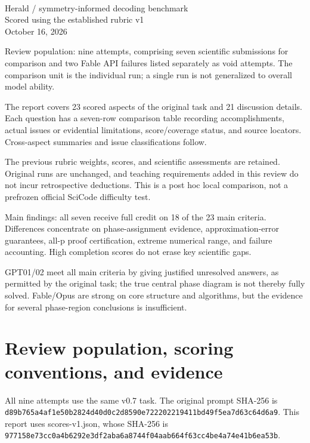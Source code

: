 \documentclass[11pt,a4paper]{article}
\begin{document}
\fontsize{10.5}{15.2}\selectfont

\begin{center}\vspace*{12mm}{\LARGE\bfseries Seven valid AI submissions\\[4mm]Aspect-by-aspect comparative study}\\[6mm]{\large Herald / symmetry-informed decoding benchmark}\\[3mm]{\large Scored using the established rubric v1}\\[5mm]October 16, 2026\end{center}
Review population: nine attempts,\allowbreak{} comprising seven scientific submissions for comparison and two Fable API failures listed separately as void attempts. The comparison unit is the individual run; a single run is not generalized to overall model ability.

The report covers 23 scored aspects of the original task and 21 discussion details. Each question has a seven-row comparison table recording accomplishments,\allowbreak{} actual issues or evidential limitations,\allowbreak{} score/\allowbreak{}coverage status,\allowbreak{} and source locators. Cross-aspect summaries and issue classifications follow.

The previous rubric weights,\allowbreak{} scores,\allowbreak{} and scientific assessments are retained. Original runs are unchanged,\allowbreak{} and teaching requirements added in this review do not incur retrospective deductions. This is a post hoc local comparison,\allowbreak{} not a prefrozen official SciCode difficulty test.

Main findings: all seven receive full credit on 18 of the 23 main criteria. Differences concentrate on phase-assignment evidence,\allowbreak{} approximation-error guarantees,\allowbreak{} all-p proof certification,\allowbreak{} extreme numerical range,\allowbreak{} and failure accounting. High completion scores do not erase key scientific gaps.

GPT01/\allowbreak{}02 meet all main criteria by giving justified unresolved answers,\allowbreak{} as permitted by the original task; the true central phase diagram is not thereby fully solved. Fable/\allowbreak{}Opus are strong on core structure and algorithms,\allowbreak{} but the evidence for several phase-region conclusions is insufficient.

\clearpage
\tableofcontents
\clearpage
\section{Review population,\allowbreak{} scoring conventions,\allowbreak{} and evidence}
All nine attempts use the same v0.7 task. The original prompt SHA-256 is \nolinkurl{d89b765a4af1e50b2824d40d0c2d8590e722202219411bd49f5ea7d63c64d6a9}. This report uses scores-v1.json,\allowbreak{} whose SHA-256 is \nolinkurl{977158e73cc0a4b6292e3df2aba6a8744f04aab664f63cc4be4a74e41b6ea53b}. 
\end{document}

